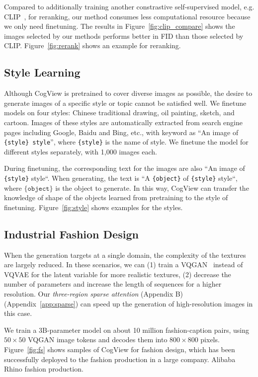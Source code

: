 Compared to additionally training another constrastive self-supervised model, e.g. CLIP~\cite{radford2021learning}, for reranking, our method consumes less computational resource because we only need finetuning. The results in Figure~\ref{fig:clip_compare} shows the images selected by our methods performs better in FID than those selected by CLIP. Figure~\ref{fig:rerank} shows an example for reranking.

\subsection{Style Learning} Although CogView is pretrained to cover diverse images as possible, the desire to generate images of a specific style or topic cannot be satisfied well. We finetune models on four styles: Chinese traditional drawing, oil painting, sketch, and cartoon. Images of these styles are automatically extracted from search engine pages including Google, Baidu and Bing, etc., with keyword as ``An image of \texttt{\{style\} style}'', where \texttt{\{style\}} is the name of style. We finetune the model for different styles separately, with 1,000 images each.

During finetuning, the corresponding text for the images are also ``An image of \texttt{\{style\}} style``. When generating, the text is ``A \texttt{\{object\}} of \texttt{\{style\}} style``, where $\texttt{\{object\}}$ is the object to generate. In this way, CogView can transfer the knowledge of shape of the objects learned from pretraining to the style of finetuning. Figure~\ref{fig:style} shows examples for the styles.

\subsection{Industrial Fashion Design}

When the generation targets at a single domain, the complexity of the textures are largely reduced. In these scenarios, we can (1) train a VQGAN~\cite{esser2020taming} instead of VQVAE for the latent variable for more realistic textures, (2) decrease the number of parameters and increase the length of sequences for a higher resolution. Our \emph{three-region sparse attention}
\ifblind
(Appendix B) \else
(Appendix~\ref{app:sparse})
\fi can speed up the generation of high-resolution images in this case.

We train a 3B-parameter model on about 10 million fashion-caption pairs, using $50\times 50$ VQGAN image tokens and decodes them into $800\times 800$ pixels. Figure~\ref{fig:fs} shows samples of CogView for fashion design, which has been successfully deployed to \ifblind the fashion production in a large company.
\else 
Alibaba Rhino fashion production. 
\fi

